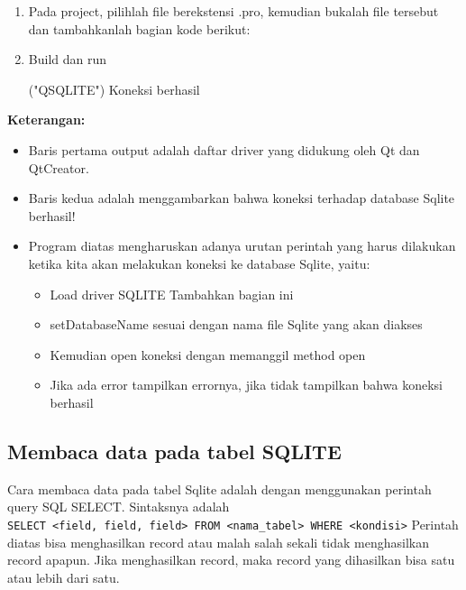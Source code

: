 \begin{enumerate}
\item
Pada project, pilihlah file berekstensi .pro, kemudian bukalah file
tersebut dan tambahkanlah bagian kode berikut:



\item
Build dan run

\begin{lcverbatim}
("QSQLITE")
Koneksi berhasil
\end{lcverbatim}
\end{enumerate}

\textbf{Keterangan:}

\begin{itemize}

\item
Baris pertama output adalah daftar driver yang didukung oleh Qt dan
QtCreator.
\item
Baris kedua adalah menggambarkan bahwa koneksi terhadap database
Sqlite berhasil!
\item
Program diatas mengharuskan adanya urutan perintah yang harus
dilakukan ketika kita akan melakukan koneksi ke database Sqlite,
yaitu:

\begin{itemize}
\item Load driver SQLITE Tambahkan bagian ini
\item setDatabaseName sesuai dengan nama file Sqlite yang akan diakses
\item Kemudian open koneksi dengan memanggil method open
\item Jika ada error tampilkan errornya, jika tidak tampilkan bahwa koneksi berhasil
\end{itemize}

\end{itemize}

\subsection{Membaca data pada tabel SQLITE}

Cara membaca data pada tabel Sqlite adalah dengan menggunakan perintah
query SQL SELECT. Sintaksnya adalah
\texttt{SELECT\ \textless{}field,\ field,\ field\textgreater{}\ FROM\ \textless{}nama\_tabel\textgreater{}\ WHERE\ \textless{}kondisi\textgreater{}}
Perintah diatas bisa menghasilkan record atau malah salah sekali tidak
menghasilkan record apapun. Jika menghasilkan record, maka record yang
dihasilkan bisa satu atau lebih dari satu.

